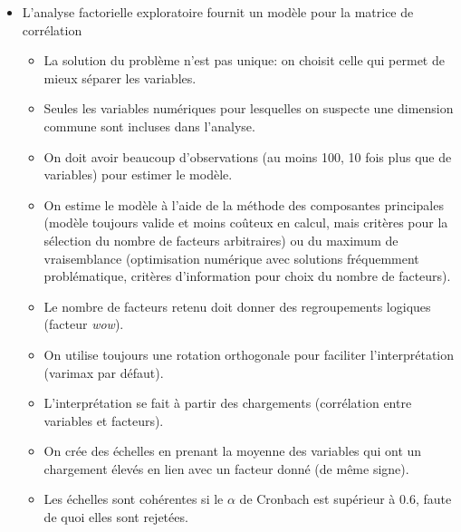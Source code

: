 \documentclass[
  11pt,
  letterpaper,
]{scrbook}
\providecommand{\tightlist}{%
  \setlength{\itemsep}{0pt}\setlength{\parskip}{0pt}}\usepackage{longtable,booktabs,array}
\theoremstyle{definition}
\theoremstyle{remark}
\begin{document}
\begin{tcolorbox}[enhanced jigsaw, coltitle=black, left=2mm, opacitybacktitle=0.6, colback=white, leftrule=.75mm, colframe=quarto-callout-note-color-frame, toprule=.15mm, colbacktitle=quarto-callout-note-color!10!white, opacityback=0, bottomtitle=1mm, toptitle=1mm, rightrule=.15mm, title=\textcolor{quarto-callout-note-color}{\faInfo}\hspace{0.5em}{En résumé}, breakable, titlerule=0mm, arc=.35mm, bottomrule=.15mm]

\begin{itemize}
\tightlist
\item
  L'analyse factorielle exploratoire fournit un modèle pour la matrice
  de corrélation

  \begin{itemize}
  \tightlist
  \item
    La solution du problème n'est pas unique: on choisit celle qui
    permet de mieux séparer les variables.
  \item
    Seules les variables numériques pour lesquelles on suspecte une
    dimension commune sont incluses dans l'analyse.
  \item
    On doit avoir beaucoup d'observations (au moins 100, 10 fois plus
    que de variables) pour estimer le modèle.
  \item
    On estime le modèle à l'aide de la méthode des composantes
    principales (modèle toujours valide et moins coûteux en calcul, mais
    critères pour la sélection du nombre de facteurs arbitraires) ou du
    maximum de vraisemblance (optimisation numérique avec solutions
    fréquemment problématique, critères d'information pour choix du
    nombre de facteurs).
  \item
    Le nombre de facteurs retenu doit donner des regroupements logiques
    (facteur \emph{wow}).
  \item
    On utilise toujours une rotation orthogonale pour faciliter
    l'interprétation (varimax par défaut).
  \item
    L'interprétation se fait à partir des chargements (corrélation entre
    variables et facteurs).
  \item
    On crée des échelles en prenant la moyenne des variables qui ont un
    chargement élevés en lien avec un facteur donné (de même signe).
  \item
    Les échelles sont cohérentes si le \(\alpha\) de Cronbach est
    supérieur à 0.6, faute de quoi elles sont rejetées.
  \end{itemize}
\end{itemize}

\end{tcolorbox}
\end{document}
